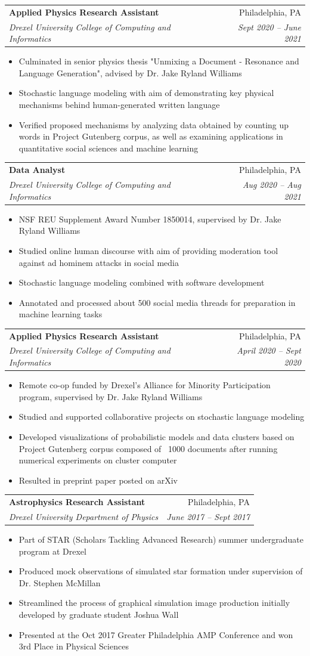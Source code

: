 \documentclass[a4paper,11pt]{article}
\makeatletter
\newcommand{\resumeItem}[1]{
  \item\small{
    {#1 \vspace{-2pt}}
  }
}
\newcommand{\resumeSubheading}[4]{
  \vspace{-2pt}\item
    \begin{tabular*}{0.97\textwidth}[t]{l@{\extracolsep{\fill}}r}
      \textbf{#1} & #2 \\
      \textit{\small#3} & \textit{\small #4} \\
    \end{tabular*}\vspace{-7pt}
}
\newcommand{\resumeItemListStart}{\begin{itemize}}
\newcommand{\resumeItemListEnd}{\end{itemize}\vspace{-5pt}}
\makeatother
\begin{document}
    \resumeSubheading
      {Applied Physics Research Assistant}{Philadelphia, PA}
      {Drexel University College of Computing and Informatics}{Sept 2020 -- June 2021}
      \resumeItemListStart
        \resumeItem{Culminated in senior physics thesis "Unmixing a Document - Resonance and Language Generation", advised by Dr. Jake Ryland Williams}
        \resumeItem{Stochastic language modeling with aim of demonstrating key physical mechanisms behind human-generated written language}
        \resumeItem{Verified proposed mechanisms by analyzing data obtained by counting up words in Project Gutenberg corpus, as well as examining applications in quantitative social sciences and machine learning}
      \resumeItemListEnd

    \resumeSubheading
      {Data Analyst}{Philadelphia, PA}
      {Drexel University College of Computing and Informatics}{Aug 2020 -- Aug 2021}
      \resumeItemListStart
        \resumeItem{NSF REU Supplement Award Number 1850014, supervised by Dr. Jake Ryland Williams}
        \resumeItem{Studied online human discourse with aim of providing moderation tool against ad hominem attacks in social media}
        \resumeItem{Stochastic language modeling combined with software development}
        \resumeItem{Annotated and processed about 500 social media threads for preparation in machine learning tasks}
      \resumeItemListEnd
      
    \resumeSubheading
      {Applied Physics Research Assistant}{Philadelphia, PA}
      {Drexel University College of Computing and Informatics}{April 2020 -- Sept 2020}
      \resumeItemListStart
        \resumeItem{Remote co-op funded by Drexel's Alliance for Minority Participation program, supervised by Dr. Jake Ryland Williams}
        \resumeItem{Studied and supported collaborative projects on stochastic language modeling}
        \resumeItem{Developed visualizations of probabilistic models and data clusters based on Project Gutenberg corpus composed of ~1000 documents after running numerical experiments on cluster computer}
        \resumeItem{Resulted in preprint paper posted on arXiv}
      \resumeItemListEnd
      
    \resumeSubheading
      {Astrophysics Research Assistant}{Philadelphia, PA}
      {Drexel University Department of Physics}{June 2017 -- Sept 2017}
      \resumeItemListStart
        \resumeItem{Part of STAR (Scholars Tackling Advanced Research) summer undergraduate program at Drexel}
        \resumeItem{Produced mock observations of simulated star formation under supervision of Dr. Stephen McMillan}
        \resumeItem{Streamlined the process of graphical simulation image production initially developed by graduate student Joshua Wall}
        \resumeItem{Presented at the Oct 2017 Greater Philadelphia AMP Conference and won 3rd Place in Physical Sciences}
      \resumeItemListEnd
      
\end{document}
